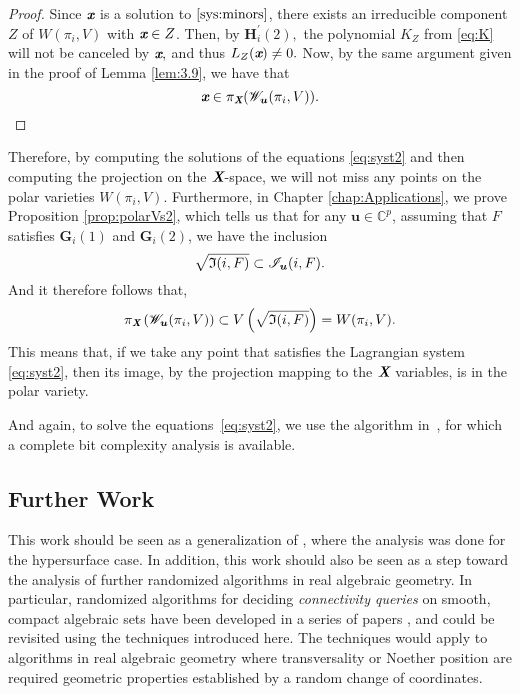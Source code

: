 \documentclass[a4paper]{article}
\def\Xb{\textit{\textbf{X}}}
\def\ub{{\bm u}}
\def\xb{\textit{\textbf{x}}}
\def\C{\mathbb{C}}
\def\Ii{\mathfrak{I}(i,F)}
\def\Iil{\mathscr{I}_{\ub}(i,F)}
\def\Wil{\mathscr{W}_{\ub}(\pi_i,V)}
\begin{document}
\begin{proof}
Since $\xb$ is a solution to $\ref{sys:minors}$, there exists an irreducible component $Z$ of $W(\pi_i,V)$ with $\xb \in Z$. Then, by $\bm H_i^{'}(2),$ the polynomial $K_Z$ from \ref{eq:K} will not be canceled by $\xb,$ and thus $L_Z(\xb) \not = 0.$ Now, by the same argument given in the proof of Lemma \ref{lem:3.9}, we have that 
\[
\xb \in \pi_{\Xb} ( \Wil).
\]
\end{proof}
\noindent 
Therefore, by computing the solutions of the equations \ref{eq:syst2} and then computing the projection on the $\Xb$-space, we will not miss any points on the polar varieties $W(\pi_i,V).$ Furthermore, in Chapter \ref{chap:Applications}, we prove Proposition \ref{prop:polarVs2}, which tells us that for any $\ub \in \C^p$, assuming that $F$ satisfies $\bm G_i(1)$ and $\bm G_i(2)$, we have the inclusion 
    \[
    \sqrt{\frak{I}(i,F)} \subset \Iil.
    \]
And it therefore follows that, 
\[
\pi_{\Xb}\left(\Wil\right) \subset V\left(\sqrt{\Ii}\right) = W(\pi_i,V).
\]
This means that, if we take any point that satisfies the Lagrangian system \ref{eq:syst2}, then its image, by the projection mapping to the $\Xb$ variables, is in the polar variety. 
\par 
And again, to solve the equations~\eqref{eq:syst2}, we use the algorithm
in~\cite{SH}, for which a complete bit complexity analysis is
available. 



\subsection{Further Work}
This work should be seen as a generalization of \cite{ElGiSh20}, where the analysis was done for the hypersurface case. In addition, this work should also be seen as a step toward the analysis of
further randomized algorithms in real algebraic geometry.  In particular, randomized algorithms for deciding {\em
  connectivity queries} on smooth, compact algebraic sets have been
developed in a series of papers
\cite{SchostMohabBabySteps2011,SchostMohabBabySteps2014}, and could be
revisited using the techniques introduced here. The techniques would apply to algorithms in real algebraic geometry where transversality or Noether position are required geometric properties established by a random change of coordinates.
\end{document}
